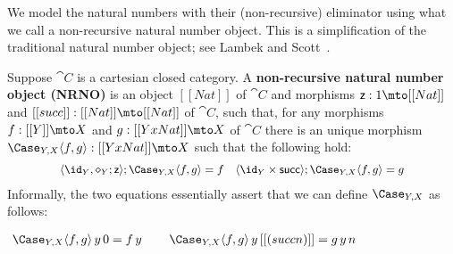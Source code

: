 We model the natural numbers with their (non-recursive) eliminator
using what we call a non-recursive natural number object.  This is a
simplification of the traditional natural number object; see Lambek
and Scott~\cite{Lambek:1988}.
\begin{definition}
  \label{def:SNNO}
  Suppose $\cat{C}$ is a cartesian closed category.  A
  \textbf{non-recursive natural number object (NRNO)} is an object
  $[[Nat]]$ of $\cat{C}$ and morphisms $\mathsf{z} : 1 \mto [[Nat]]$
  and $[[succ]] : [[Nat]] \mto [[Nat]]$ of $\cat{C}$, such that, for
  any morphisms $f : [[Y]] \mto X$ and $g : [[Y x Nat]] \mto X$ of
  $\cat{C}$ there is an unique morphism $\Case_{Y,X} \langle f,g \rangle : [[Y x Nat]] \mto X$
  such that the following hold:
  \[\small
  \setlength{\arraycolsep}{0pt}
  \begin{array}{cccccc}    
    \langle \id_Y, \diamond_Y;\mathsf{z} \rangle;\Case_{Y,X} \langle f,g \rangle = f & \quad &
    \langle \id_Y \times \mathsf{succ} \rangle;\Case_{Y,X} \langle f,g \rangle = g\\
  \end{array}
  \]  
  \noindent
       Informally, the two equations essentially assert that we can
       define $\Case_{Y,X}$ as follows:
       \begin{center}
         \begin{math}
           \setlength{\arraycolsep}{3pt}
           \begin{array}{ccccccccccc}
             {\Case_{Y,X} \langle f,g \rangle\,y\,0 = f\,y}
             & \quad & 
             {\Case_{Y,X} \langle f,g \rangle\,y\,[[(succ n)]] =  g\,y\,n}
           \end{array}
         \end{math}
       \end{center}
\end{definition}

